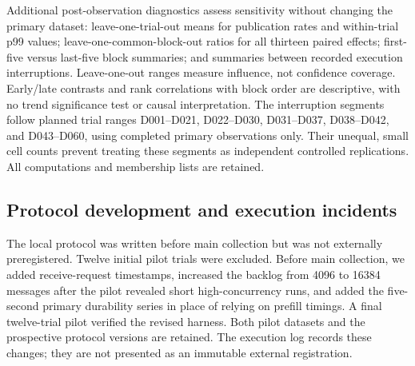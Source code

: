\documentclass[11pt]{article}
\theoremstyle{definition}
\begin{document}
Additional post-observation diagnostics assess sensitivity without changing the primary dataset: leave-one-trial-out means for publication rates and within-trial p99 values; leave-one-common-block-out ratios for all thirteen paired effects; first-five versus last-five block summaries; and summaries between recorded execution interruptions. Leave-one-out ranges measure influence, not confidence coverage. Early/late contrasts and rank correlations with block order are descriptive, with no trend significance test or causal interpretation. The interruption segments follow planned trial ranges D001--D021, D022--D030, D031--D037, D038--D042, and D043--D060, using completed primary observations only. Their unequal, small cell counts prevent treating these segments as independent controlled replications. All computations and membership lists are retained.


\subsection{Protocol development and execution incidents}

The local protocol was written before main collection but was not externally preregistered. Twelve initial pilot trials were excluded. Before main collection, we added receive-request timestamps, increased the backlog from 4096 to 16384 messages after the pilot revealed short high-concurrency runs, and added the five-second primary durability series in place of relying on prefill timings. A final twelve-trial pilot verified the revised harness. Both pilot datasets and the prospective protocol versions are retained. The execution log records these changes; they are not presented as an immutable external registration.
\end{document}
